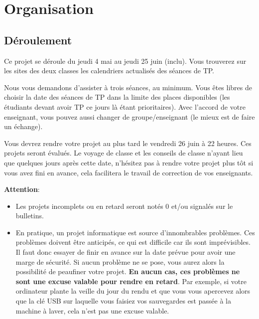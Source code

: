 \section{Organisation}

\subsection{Déroulement}

Ce projet se déroule du jeudi 4 mai au jeudi 25 juin (inclu). Vous trouverez sur les sites des deux 
classes les calendriers actualisés des séances de TP. 


Nous vous demandons d'assister à trois séances, au minimum. 
Vous êtes libres de choisir la date des séances de TP dans la limite des places disponibles (les étudiants devant avoir TP ce jours là étant prioritaires). 
Avec l'accord de votre enseignant, vous pouvez aussi changer de groupe/enseignant (le mieux est de faire un échange). 

Vous devrez rendre votre projet au plus tard le vendredi 26 juin à 22 heures. Ces projets seront évalués. Le voyage de classe et les conseils de 
classe n'ayant lieu que quelques jours après cette date, n'hésitez pas à rendre votre projet plus tôt si vous avez 
fini en avance, cela facilitera le travail de correction de vos enseignants.


\textbf{Attention}:
\begin{itemize}
\item Les projets incomplets ou en retard seront notés $0$ et/ou signalés sur le bulletins.
\item En  pratique, un  projet informatique est  source d'innombrables
  problèmes.   Ces  problèmes  doivent  être  anticipés,  ce  qui  est
  difficile car ils sont imprévisibles.  Il faut donc essayer de finir
  en avance sur  la date prévue pour avoir une  marge de sécurité.  Si
  aucun  problème ne  se  pose,  vous aurez  alors  la possibilité  de
  peaufiner votre  projet.  \textbf{En  aucun cas, ces  problèmes ne  sont une
  excuse  valable  pour  rendre  en retard}.   Par  exemple,  si  votre
  ordinateur  plante la  veille  du jour  du rendu  et  que vous  vous
  apercevez  alors  que la  clé  USB  sur  laquelle vous  faisiez  vos
  sauvegardes est  passée à  la machine  à laver,  cela n'est  pas une
  excuse valable.
\end{itemize}

